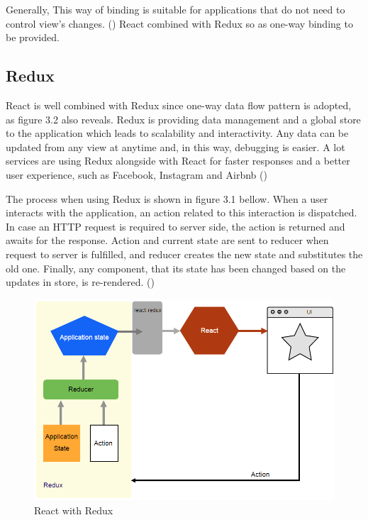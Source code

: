 Generally, This way of binding is suitable for applications that do not need to control view's changes. (\cite{Reference21}) React combined with Redux so as one-way binding to be provided. \par

\subsection{Redux}

React is well combined with Redux since one-way data flow pattern is adopted, as figure 3.2 also reveals. Redux is providing data management and a global store to the application which leads to scalability and interactivity. Any data can be updated from any view at anytime and, in this way, debugging is easier. A lot services are using Redux alongside with React for faster responses and a better user experience, such as Facebook, Instagram and Airbnb (\cite{Reference12})

The process when using Redux is shown in figure 3.1 bellow. When a user interacts with the application, an action related to this interaction is dispatched. In case an HTTP request is required to server side, the action is returned and awaits for the response. Action and current state are sent to reducer when request to server is fulfilled, and reducer creates the new state and substitutes the old one. Finally, any component, that its state has been changed based on the updates in store, is re-rendered. (\citeyearpar{murray2018ng})

\begin{figure}[h!]
	\begin{center}
		\includegraphics[scale=0.3]{images/Redux.png}
	\end{center}
	\caption{React with Redux}
\end{figure}

